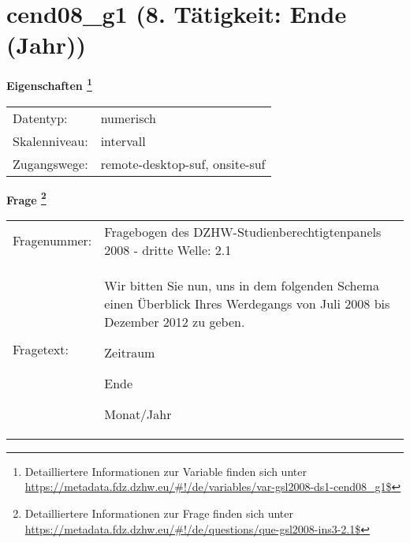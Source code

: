
    \setcounter{footnote}{0}

    \vspace*{-1.8cm}
	\section{cend08\_g1 (8. Tätigkeit: Ende (Jahr))}
	\label{section:cend08_g1}



    \vspace*{0.5cm}
    \noindent\textbf{Eigenschaften
	\footnote{Detailliertere Informationen zur Variable finden sich unter
		\url{https://metadata.fdz.dzhw.eu/\#!/de/variables/var-gsl2008-ds1-cend08_g1$}}}\\
	\begin{tabularx}{\hsize}{@{}lX}
	Datentyp: & numerisch \\
	Skalenniveau: & intervall \\
	Zugangswege: &
	  remote-desktop-suf, 
	  onsite-suf
 \\
    \end{tabularx}



				\vspace*{0.5cm}
                \noindent\textbf{Frage
	                \footnote{Detailliertere Informationen zur Frage finden sich unter
		              \url{https://metadata.fdz.dzhw.eu/\#!/de/questions/que-gsl2008-ins3-2.1$}}}\\
				\begin{tabularx}{\hsize}{@{}lX}
					Fragenummer: &
					  Fragebogen des DZHW-Studienberechtigtenpanels 2008 - dritte Welle:
					  2.1
 \\
					Fragetext: & Wir bitten Sie nun, uns in dem folgenden Schema einen Überblick Ihres Werdegangs von Juli 2008 bis Dezember 2012 zu geben.\par  Zeitraum\par  Ende\par  Monat/Jahr \\
				\end{tabularx}





